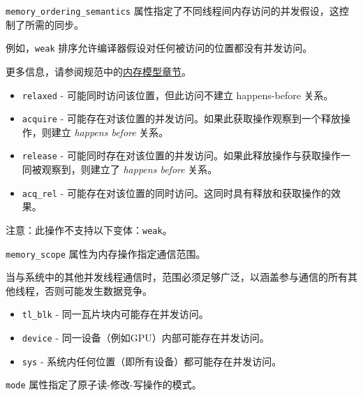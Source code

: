 \documentclass{article}
\begin{document}
\texttt{memory\_ordering\_semantics} 属性指定了不同线程间内存访问的并发假设，这控制了所需的同步。

例如，\texttt{weak} 排序允许编译器假设对任何被访问的位置都没有并发访问。

更多信息，请参阅规范中的\href{https://docs.nvidia.com/cuda/tile-ir/latest/sections/memory_model.html#section-memory-model}{内存模型章节}。



\begin{itemize}
\item \texttt{relaxed} - 可能同时访问该位置，但此访问不建立 happens-before 关系。
\item \texttt{acquire} - 可能存在对该位置的并发访问。如果此获取操作观察到一个释放操作，则建立 \textit{happens before} 关系。
\item \texttt{release} - 可能同时存在对该位置的并发访问。如果此释放操作与获取操作一同被观察到，则建立了 \textit{happens before} 关系。
\item \texttt{acq\_rel} - 可能存在对该位置的同时访问。这同时具有释放和获取操作的效果。


\end{itemize}
注意：此操作不支持以下变体：\texttt{weak}。



\texttt{memory\_scope} 属性为内存操作指定通信范围。

当与系统中的其他并发线程通信时，范围必须足够广泛，以涵盖参与通信的所有其他线程，否则可能发生数据竞争。



\begin{itemize}
\item \texttt{tl\_blk} - 同一瓦片块内可能存在并发访问。
\item \texttt{device} - 同一设备（例如GPU）内部可能存在并发访问。
\item \texttt{sys} - 系统内任何位置（即所有设备）都可能存在并发访问。


\end{itemize}
\texttt{mode} 属性指定了原子读-修改-写操作的模式。
\end{document}
